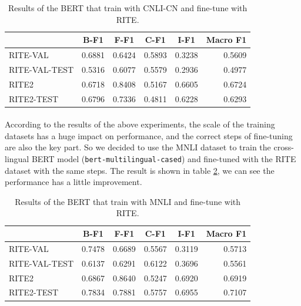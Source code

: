 \documentclass{article}
\begin{document}
\begin{CJK*}{UTF8}{bkai}
\begin{table}[ht!]
  \centering
  \begin{tabular}{|l|r|r|r|r|r|}
  \hline
   & \multicolumn{1}{c|}{B-F1} & \multicolumn{1}{c|}{F-F1} & \multicolumn{1}{c|}{C-F1} & \multicolumn{1}{c|}{I-F1} & \multicolumn{1}{c|}{Macro F1} \\ \hline
  RITE-VAL & 0.6881 & 0.6424 & 0.5893 & 0.3238 & 0.5609 \\ \hline
  RITE-VAL-TEST & 0.5316 & 0.6077 & 0.5579 & 0.2936 & 0.4977 \\ \hline
  RITE2 & 0.6718 & 0.8408 & 0.5167 & 0.6605 & 0.6724 \\ \hline
  RITE2-TEST & 0.6796 & 0.7336 & 0.4811 & 0.6228 & 0.6293 \\ \hline
  \end{tabular}
  \caption{Results of the BERT that train with CNLI-CN and fine-tune with RITE.}
  \label{result:bert_cnli_cn}
\end{table}

\paragraph{}
According to the results of the above experiments, the scale of the training datasets has a huge impact on performance, and the correct steps of fine-tuning are also the key part. So we decided to use the MNLI dataset to train the cross-lingual BERT model (\texttt{bert-multilingual-cased}) and fine-tuned with the RITE dataset with the same steps. The result is shown in table \ref{result:bert_mnli_transfer}, we can see the performance has a little improvement.

\begin{table}[ht!]
  \centering
  \begin{tabular}{|l|r|r|r|r|r|}
  \hline
   & \multicolumn{1}{c|}{B-F1} & \multicolumn{1}{c|}{F-F1} & \multicolumn{1}{c|}{C-F1} & \multicolumn{1}{c|}{I-F1} & \multicolumn{1}{c|}{Macro F1} \\ \hline
  RITE-VAL & 0.7478 & 0.6689 & 0.5567 & 0.3119 & 0.5713 \\ \hline
  RITE-VAL-TEST & 0.6137 & 0.6291 & 0.6122 & 0.3696 & 0.5561 \\ \hline
  RITE2 & 0.6867 & 0.8640 & 0.5247 & 0.6920 & 0.6919 \\ \hline
  RITE2-TEST & 0.7834 & 0.7881 & 0.5757 & 0.6955 & 0.7107 \\ \hline
  \end{tabular}
  \caption{Results of the BERT that train with MNLI and fine-tune with RITE.}
  \label{result:bert_mnli_transfer}
\end{table}


\end{CJK*}
\end{document}
